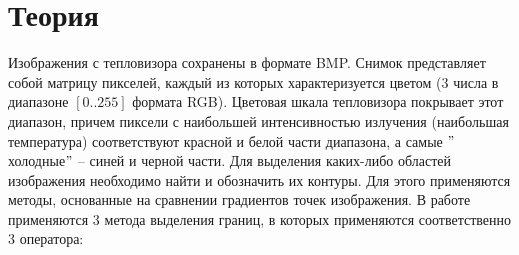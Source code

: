 \section{Теория}

Изображения с тепловизора  сохранены в формате BMP. Снимок представляет собой матрицу пикселей, каждый из которых характеризуется цветом (3 числа в диапазоне $[0..255]$ формата RGB). Цветовая шкала тепловизора покрывает этот диапазон, причем пиксели с наибольшей интенсивностью излучения (наибольшая температура) соответствуют красной и белой части диапазона, а самые $"$холодные$"$ -- синей и черной части.
\newline
Для выделения каких-либо областей изображения необходимо найти и обозначить их контуры. Для этого применяются методы, основанные на сравнении градиентов точек изображения.
\newline 
В работе применяются 3 метода выделения границ, в которых применяются соответственно 3 оператора:
